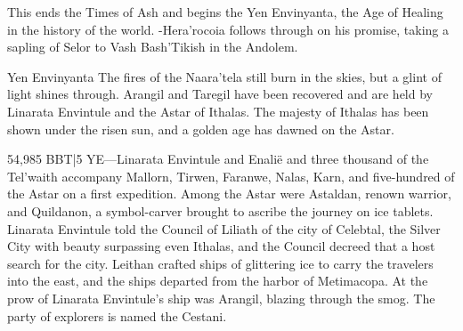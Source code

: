 \documentclass[smalldemyvopaper,11pt,twoside,onecolumn,openright,extrafontsizes]{memoir}
\begin{document}
	This ends the Times of Ash and begins the Yen Envinyanta, the Age of Healing in the history of the world.
-Hera’rocoia follows through on his promise, taking a sapling of Selor to Vash Bash’Tikish in the Andolem.

Yen Envinyanta
The fires of the Naara’tela still burn in the skies, but a glint of light shines through. Arangil and Taregil have been recovered and are held by Linarata Envintule and the Astar of Ithalas. The majesty of Ithalas has been shown under the risen sun, and a golden age has dawned on the Astar.

54,985 BBT|5 YE—Linarata Envintule and Enalië and three thousand of the Tel’waith accompany Mallorn, Tirwen, Faranwe, Nalas, Karn, and five-hundred of the Astar on a first expedition. Among the Astar were Astaldan, renown warrior, and Quildanon, a symbol-carver brought to ascribe the journey on ice tablets. Linarata Envintule told the Council of Liliath of the city of Celebtal, the Silver City with beauty surpassing even Ithalas, and the Council decreed that a host search for the city. Leithan crafted ships of glittering ice to carry the travelers into the east, and the ships departed from the harbor of Metimacopa. At the prow of Linarata Envintule’s ship was Arangil, blazing through the smog. The party of explorers is named the Cestani.
\end{document}
